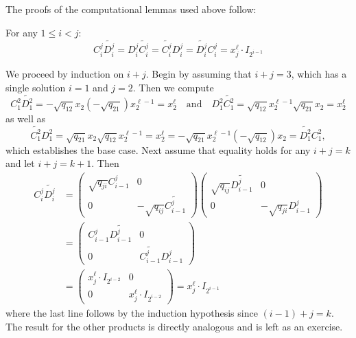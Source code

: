 \documentclass [11pt, proquest] {uwthesis}[2020/02/24]
\begin{document}
        The proofs of the computational lemmas used above follow:
    \begin{lem}\label{lem:monomial}
        For any $1\le i<j$:
        \[C_i^j\widetilde{D_i^j}=D_i^j\widetilde{C_i^j}=\widetilde{C_i^j}D_i^j=\widetilde{D_i^j}C_i^j=x_j^\ell \cdot I_{2^{i-1}}\]
    \end{lem}
    \begin{prf}
        We proceed by induction on $i+j$. Begin by assuming that $i+j=3$, which has a single solution $i=1$ and $j=2$. Then we compute
        \[C_1^2\widetilde{D_1^2}=-\sqrt{q_{12}}x_2(-\sqrt{q_{21}})x_2^{\ell-1}=x_2^{\ell}\quad\text{and}\quad D_1^2\widetilde{C_1^2}=\sqrt{q_{12}}x_2^{\ell-1}\sqrt{q_{21}}x_2=x_2^\ell\]
        as well as
        \[\widetilde{C_1^2}D_1^2=\sqrt{q_{21}}x_2\sqrt{q_{12}}x_2^{\ell-1}=x_2^\ell=-\sqrt{q_{21}}x_2^{\ell-1}(-\sqrt{q_{12}})x_2=\widetilde{D_1^2}C_1^2,\]
        which establishes the base case.
        Next assume that equality holds for any $i+j=k$ and let $i+j=k+1.$ Then
        \begin{align*}
            C_i^j\widetilde{D_i^j} &=\begin{pmatrix}\sqrt{q_{ji}}C_{i-1}^j & 0\\0 & -\sqrt{q_{ij}}\widetilde{C_{i-1}^j}\end{pmatrix}
            \begin{pmatrix}\sqrt{q_{ij}}\widetilde{D_{i-1}^j} & 0\\0 & -\sqrt{q_{ji}}D_{i-1}^j\end{pmatrix}\\
            &=\begin{pmatrix}C_{i-1}^j\widetilde{D_{i-1}^j} & 0 \\ 0 & \widetilde{C_{i-1}^j}D_{i-1}^j\end{pmatrix}\\
            &=\begin{pmatrix}x_j^\ell \cdot I_{2^{i-2}} & 0\\0 & x_j^\ell \cdot I_{2^{i-2}}\end{pmatrix}=x_j^\ell \cdot I_{2^{i-1}}
        \end{align*}
        where the last line follows by the induction hypothesis since $(i-1)+j = k.$ The result for the other products is directly analogous and is left as an exercise.
    \end{prf}
        
\end{document}
